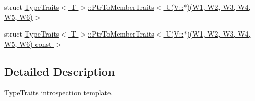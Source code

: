 \begin{DoxyCompactItemize}
\item 
struct \hyperlink{structTypeTraits_1_1PtrToMemberTraits_3_01U_07V_1_1_5_08_07W1_00_01W2_00_01W3_00_01W4_00_01W5_00_01W6_08_4}{Type\+Traits$<$ T $>$\+::\+Ptr\+To\+Member\+Traits$<$ U(\+V\+::$\ast$)(\+W1, W2, W3, W4, W5, W6)$>$}
\item 
struct \hyperlink{structTypeTraits_1_1PtrToMemberTraits_3_01U_07V_1_1_5_08_07W1_00_01W2_00_01W3_00_01W4_00_01W5_00_01W6_08_01const_01_01_4}{Type\+Traits$<$ T $>$\+::\+Ptr\+To\+Member\+Traits$<$ U(\+V\+::$\ast$)(\+W1, W2, W3, W4, W5, W6) const  $>$}
\end{DoxyCompactItemize}


\subsection{Detailed Description}
\hyperlink{structTypeTraits}{Type\+Traits} introspection template. 